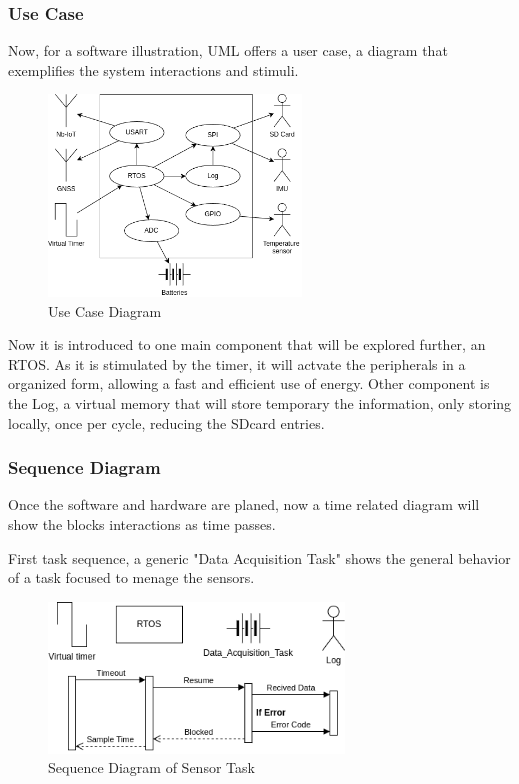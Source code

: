 \subsubsection{Use Case}

Now, for a software illustration, UML offers a user case, a diagram that exemplifies the system interactions and stimuli.

\begin{figure}[H]
    \centering
    \includegraphics[width=0.6\textwidth]{images/diagrams/use_case/Use Case.drawio.png}  %
    \caption{Use Case Diagram}
    \label{fig:Use Case Diagram}        
\end{figure}

Now it is introduced to one main component that will be explored further, an RTOS. As it is stimulated by the timer, it will actvate the 
peripherals in a organized form, allowing a fast and efficient use of energy. Other component is the Log, a virtual memory that will store
temporary the information, only storing locally, once per cycle, reducing the SDcard entries.

\subsubsection{Sequence Diagram}

Once the software and hardware are planed, now a time related diagram will show the blocks interactions
as time passes.

First task sequence, a generic "Data Acquisition Task" shows the general behavior of a task focused to menage the sensors.

\begin{figure}[H]
    \centering
    \includegraphics[width=0.7\textwidth]{images/diagrams/sequence_diagram/sequence_diagram_1/Sequence Diagram.drawio.png}  %
    \caption{Sequence Diagram of Sensor Task}
    \label{fig:Sequence Diagram of Sensor Task}
\end{figure}


